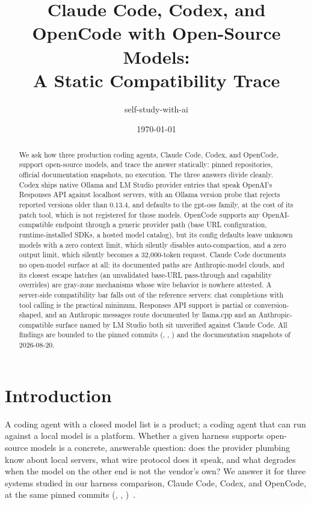 \documentclass{article}
\title{Claude Code, Codex, and OpenCode with Open-Source Models:\\
A Static Compatibility Trace}
\author{self-study-with-ai}
\date{\today}
\newcommand{\codex}[0]{Codex}
\newcommand{\occ}[0]{OpenCode}
\newcommand{\ccc}[0]{Claude Code}
\begin{document}
\maketitle

\begin{abstract}
We ask how three production coding agents, \ccc{}, \codex{}, and
\occ{}, support open-source models, and trace the answer statically:
pinned repositories, official documentation snapshots, no execution.
The three answers divide cleanly. \codex{} ships native Ollama and LM
Studio provider entries that speak OpenAI's Responses API against
localhost servers, with an Ollama version probe that rejects reported
versions older than 0.13.4, and defaults to the gpt-oss family, at the
cost of its patch tool, which is not registered for those models. \occ{} supports any OpenAI-compatible
endpoint through a generic provider path (base URL configuration,
runtime-installed SDKs, a hosted model catalog), but its config defaults
leave unknown models with a zero context limit, which silently disables
auto-compaction, and a zero output limit, which silently becomes a
32{,}000-token request. \ccc{} documents no open-model surface at all: its documented paths are
Anthropic-model clouds, and its closest escape hatches (an unvalidated
base-URL pass-through and capability overrides) are gray-zone mechanisms
whose wire behavior is nowhere attested. A server-side compatibility bar
falls out of the reference servers: chat completions with tool calling
is the practical minimum, Responses API support is partial or
conversion-shaped, and an Anthropic messages route documented by
llama.cpp and an Anthropic-compatible surface named by LM Studio both sit
unverified against \ccc{}. All findings are
bounded to the pinned commits (, ,
) and the documentation snapshots of 2026-08-20.
\end{abstract}

\section{Introduction}

A coding agent with a closed model list is a product; a coding agent
that can run against a local model is a platform. Whether a given
harness supports open-source models is a concrete, answerable question:
does the provider plumbing know about local servers, what wire protocol
does it speak, and what degrades when the model on the other end is not
the vendor's own? We answer it for three systems studied in our harness
comparison, \ccc{}, \codex{}, and \occ{}, at the same pinned commits
(, ,
)~\citep{codexRepo,opencodeRepo,claudeCodeSurface}.
\end{document}
